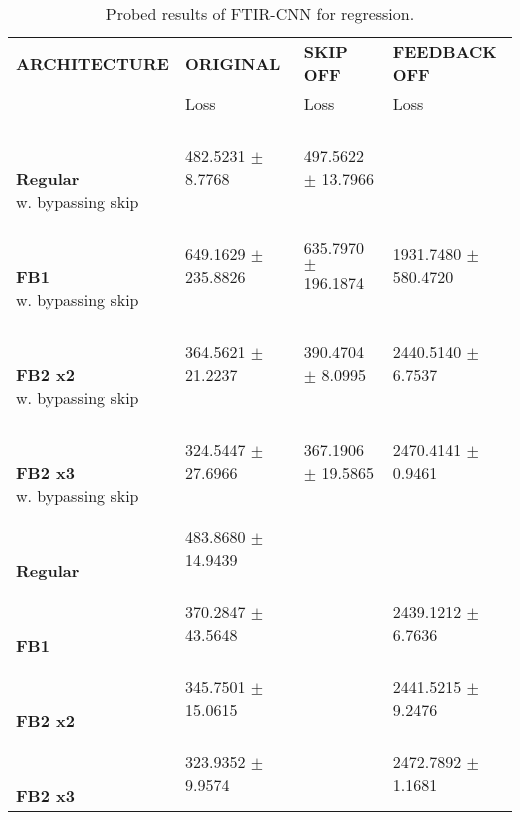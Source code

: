 
\begin{table}[h]
    \centering
    \begin{tabular}{|>{\columncolor{gray!05}}l|l|l|l|}
        \hline
        \rowcolor{gray!20}
        \textbf{\footnotesize ARCHITECTURE} & \textbf{\footnotesize ORIGINAL} & \textbf{\footnotesize SKIP OFF} & \textbf{\footnotesize FEEDBACK OFF} \\

        \rowcolor{gray!20}
        & {\footnotesize Loss} & {\footnotesize Loss} & {\footnotesize Loss} \\
        \hline
\shortstack[l]{\\ {} \\ \textbf{Regular}\\{w. bypassing skip}} & 482.5231 $\pm$ 8.7768 & 497.5622 $\pm$ 13.7966 &  \\
 \hline 
\shortstack[l]{\\ {} \\ \textbf{FB1}\\{w. bypassing skip}} & 649.1629 $\pm$ 235.8826 & 635.7970 $\pm$ 196.1874 & 1931.7480 $\pm$ 580.4720 \\
 \hline 
\shortstack[l]{\\ {} \\ \textbf{FB2 x2}\\{w. bypassing skip}} & 364.5621 $\pm$ 21.2237 & 390.4704 $\pm$ 8.0995 & 2440.5140 $\pm$ 6.7537 \\
 \hline 
\shortstack[l]{\\ {} \\ \textbf{FB2 x3}\\{w. bypassing skip}} & 324.5447 $\pm$ 27.6966 & 367.1906 $\pm$ 19.5865 & 2470.4141 $\pm$ 0.9461 \\
 \hline 
\shortstack[l]{\\ {} \\ \textbf{Regular}\\{}} & 483.8680 $\pm$ 14.9439 &  &  \\
 \hline 
\shortstack[l]{\\ {} \\ \textbf{FB1}\\{}} & 370.2847 $\pm$ 43.5648 &  & 2439.1212 $\pm$ 6.7636 \\
 \hline 
\shortstack[l]{\\ {} \\ \textbf{FB2 x2}\\{}} & 345.7501 $\pm$ 15.0615 &  & 2441.5215 $\pm$ 9.2476 \\
 \hline 
\shortstack[l]{\\ {} \\ \textbf{FB2 x3}\\{}} & 323.9352 $\pm$ 9.9574 &  & 2472.7892 $\pm$ 1.1681 \\
 \hline 

    \end{tabular}
    \caption{Probed results of FTIR-CNN for regression.}
    \label{tab:ftir-cnn-regression}
\end{table}
